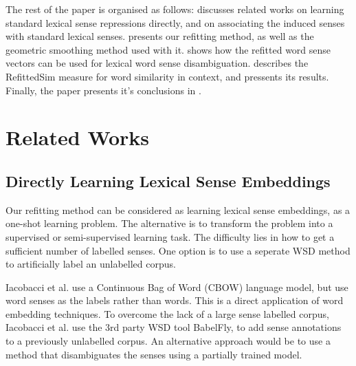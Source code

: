 \documentclass{sig-alternate}
\begin{document}
The rest of the paper is organised as follows:  discusses related works on learning standard lexical sense repressions directly, and on associating the induced senses with standard lexical senses.  presents our refitting method, as well as the geometric smoothing method used with it.  shows how the refitted word sense vectors can be used for lexical word sense disambiguation.  describes the RefittedSim measure for word similarity in context, and pressents its results. Finally, the paper presents it's conclusions in .

\section{Related Works} \label{relatedwords}

\subsection{Directly Learning Lexical Sense Embeddings}
Our refitting method can be considered as learning lexical sense embeddings, as a one-shot learning problem. The alternative is to transform the problem into a supervised or semi-supervised learning task. The difficulty lies in how to get a sufficient number of labelled senses. One option is to use a seperate WSD method to artificially label an unlabelled corpus.

Iacobacci et al. \parencite{iacobacci2015sensembed} use a Continuous Bag of Word (CBOW) \parencite{mikolov2013efficient} language model, but use word senses as the labels rather than words. This is a direct application of word embedding techniques. To overcome the lack of a large sense labelled corpus, Iacobacci et al. use the 3rd party WSD tool BabelFly, to add sense annotations to a previously unlabelled corpus. An alternative approach would be to use a method that disambiguates the senses using a partially trained model.
\end{document}
